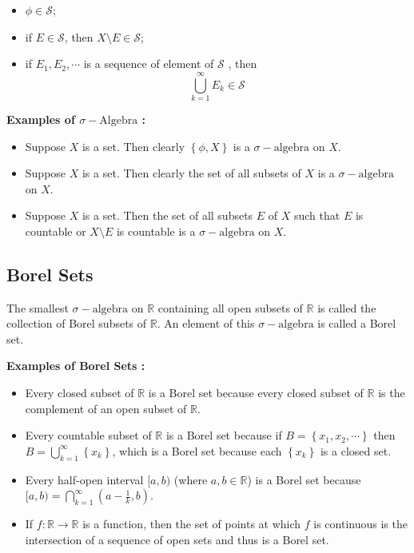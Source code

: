 \documentclass[12pt, a4paper]{article} %
\begin{document}
         
            \begin{itemize}
                \item $\phi \in \mathcal{S}$;
                \item if $E \in \mathcal{S}$, then $X \setminus E \in \mathcal{S}$;
                \item if $E_1, E_2, \cdots$ is a sequence of element of $\mathcal{S}$ , then \[\bigcup_{k=1}^{\infty}E_k \in \mathcal{S}\]
            \end{itemize}

            {\bf Examples of $\sigma-\mbox{Algebra}$ :}

            \begin{itemize}
                \item Suppose $X$ is a set. Then clearly $\left\{\phi, X \right\}$ is a $\sigma-\mbox{algebra}$ on $X$.
                \item Suppose $X$ is a set. Then clearly the set of all subsets of $X$ is a $\sigma-\mbox{algebra}$ on $X$.
                \item Suppose $X$ is a set. Then the set of all subsets $E$ of $X$ such that $E$ is countable or
                $X \setminus E$ is countable is a $\sigma-\mbox{algebra}$ on $X$.
            \end{itemize}

        \subsection{Borel Sets}   
            The smallest $\sigma-\mbox{algebra}$ on $\mathbb{R}$ containing all open subsets of $\mathbb{R}$ is called the collection of Borel subsets of $\mathbb{R}$. An element of this $\sigma-\mbox{algebra}$ is called a Borel set.

        \newpage

        {\bf Examples of Borel Sets :}

        \begin{itemize}
            \item Every closed subset of $\mathbb{R}$ is a Borel set because every closed subset of $\mathbb{R}$ is the complement of an open subset of $\mathbb{R}$.
            
            \item Every countable subset of $\mathbb{R}$ is a Borel set because if $B = \left\{x_1, x_2, \cdots \right\}$ then $B = \bigcup_{k=1}^{\infty}\left\{x_k\right\} $, which is a Borel set because each $\left\{x_k\right\}$ is a closed set.
            
            \item Every half-open interval $[a, b)$ (where $a, b \in \mathbb{R}$) is a Borel set because $[a, b) = \bigcap_{k=1}^{\infty}\left(a-\frac{1}{k}, b\right)$.
            
            \item If $f : \mathbb{R} \to \mathbb{R}$ is a function, then the set of points at which $f$ is continuous is the intersection of a sequence of open sets and thus is a Borel set.
        \end{itemize}
\end{document}
